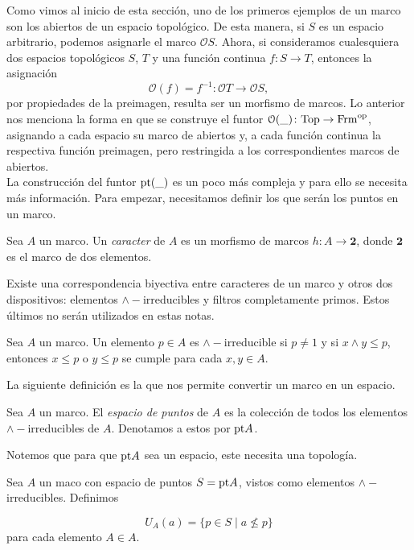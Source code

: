 \documentclass{comunicaciones}
\begin{document}
Como vimos al inicio de esta sección, uno de los primeros ejemplos de un marco son los abiertos de un espacio topológico. De esta manera, si $S$ es un espacio arbitrario, podemos asignarle el marco $\mathcal{O}S$. Ahora, si consideramos cualesquiera dos espacios topológicos $S$, $T$ y una función continua $f\colon S\to T$, entonces la asignación
\[
\mathcal{O}(f)=f^{-1}\colon \mathcal{O}T\to \mathcal{O}S,
\]
por propiedades de la preimagen, resulta ser un morfismo de marcos. Lo anterior nos menciona la forma en que se construye el funtor $\mathcal{O}(\_)\colon \mathrm{Top}\to \mathrm{Frm}^{\mathrm{op}}$, asignando a cada espacio su marco de abiertos y, a cada función continua la respectiva función preimagen, pero restringida a los correspondientes marcos de abiertos.\\

La construcción del funtor $\mathrm{pt}(\_)$ es un poco más compleja y para ello se necesita más información. Para empezar, necesitamos definir los que serán los puntos en un marco. 

\begin{dfn}
    Sea $A$ un marco. Un \emph{caracter} de $A$ es un morfismo de marcos $h\colon A\to \mathbf{2}$, donde $\mathbf{2}$ es el marco de dos elementos.
\end{dfn}

Existe una correspondencia biyectiva entre caracteres de un marco y otros dos dispositivos: elementos $\wedge-$irreducibles y filtros completamente primos. Estos últimos no serán utilizados en estas notas.

\begin{dfn}\label{infirre}
    Sea $A$ un marco. Un elemento $p\in A$ es $\wedge-$irreducible si $p\neq 1$ y si $x\wedge y\leq p$, entonces $x\leq p$ o $y\leq p$ se cumple para cada $x, y \in A$.
\end{dfn}

La siguiente definición es la que nos permite convertir un marco en un espacio.

\begin{dfn}
    Sea $A$ un marco. El \emph{espacio de puntos} de $A$ es la colección de todos los elementos $\wedge-$irreducibles de $A$. Denotamos a estos por $\mathrm{pt} A$.
\end{dfn}

Notemos que para que $\mathrm{pt} A$ sea un espacio, este necesita una topología.

\begin{dfn}
    Sea $A$ un maco con espacio de puntos $S=\mathrm{pt} A$, vistos como elementos $\wedge-$irreducibles. Definimos 

    \[
    U_A(a)=\{p\in S\mid a\nleq p\}
    \]
    para cada elemento $A\in A$. 
\end{dfn}
\end{document}
